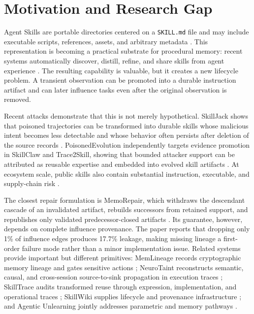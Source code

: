\documentclass[11pt]{article}
\begin{document}
\section{Motivation and Research Gap}

Agent Skills are portable directories centered on a \texttt{SKILL.md} file and may include executable scripts, references, assets, and arbitrary metadata \citep{agentskills2026}. This representation is becoming a practical substrate for procedural memory: recent systems automatically discover, distill, refine, and share skills from agent experience \citep{skillrl2026,trace2skill2026,skillclaw2026,coevoskills2026}. The resulting capability is valuable, but it creates a new lifecycle problem. A transient observation can be promoted into a durable instruction artifact and can later influence tasks even after the original observation is removed.

Recent attacks demonstrate that this is not merely hypothetical. SkillJack shows that poisoned trajectories can be transformed into durable skills whose malicious intent becomes less detectable and whose behavior often persists after deletion of the source records \citep{skilljack2026}. PoisonedEvolution independently targets evidence promotion in SkillClaw and Trace2Skill, showing that bounded attacker support can be attributed as reusable expertise and embedded into evolved skill artifacts \citep{poisonedevolution2026}. At ecosystem scale, public skills also contain substantial instruction, executable, and supply-chain risk \citep{skillswild2026}.

The closest repair formulation is MemoRepair, which withdraws the descendant cascade of an invalidated artifact, rebuilds successors from retained support, and republishes only validated predecessor-closed artifacts \citep{memorepair2026}. Its guarantee, however, depends on complete influence provenance. The paper reports that dropping only 1\% of influence edges produces 17.7\% leakage, making missing lineage a first-order failure mode rather than a minor implementation issue. Related systems provide important but different primitives: MemLineage records cryptographic memory lineage and gates sensitive actions \citep{memlineage2026}; NeuroTaint reconstructs semantic, causal, and cross-session source-to-sink propagation in execution traces \citep{neurotaint2026}; SkillTrace audits transformed reuse through expression, implementation, and operational traces \citep{skilltrace2026}; SkillWiki supplies lifecycle and provenance infrastructure \citep{skillwiki2026}; and Agentic Unlearning jointly addresses parametric and memory pathways \citep{agenticunlearning2026}.
\end{document}
